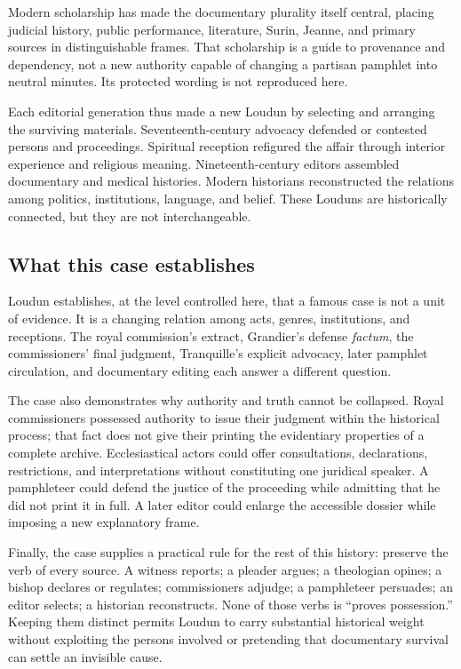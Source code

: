 Modern scholarship has made the documentary plurality itself central, placing
judicial history, public performance, literature, Surin, Jeanne, and primary
sources in distinguishable frames.  That scholarship is a guide to provenance
and dependency, not a new authority capable of changing a partisan pamphlet
into neutral minutes.  Its protected wording is not reproduced here.

Each editorial generation thus made a new Loudun by selecting and arranging
the surviving materials.  Seventeenth-century advocacy defended or contested
persons and proceedings.  Spiritual reception refigured the affair through
interior experience and religious meaning.  Nineteenth-century editors
assembled documentary and medical histories.  Modern historians reconstructed
the relations among politics, institutions, language, and belief.  These
Louduns are historically connected, but they are not interchangeable.

\subsection{What this case establishes}

Loudun establishes, at the level controlled here, that a famous case is not a
unit of evidence.  It is a changing relation among acts, genres, institutions,
and receptions.  The royal commission's extract, Grandier's defense
\emph{factum}, the commissioners' final judgment, Tranquille's explicit
advocacy, later pamphlet circulation, and documentary editing each answer a
different question.

The case also demonstrates why authority and truth cannot be collapsed.
Royal commissioners possessed authority to issue their judgment within the
historical process; that fact does not give their printing the evidentiary
properties of a complete archive.  Ecclesiastical actors could offer
consultations, declarations, restrictions, and interpretations without
constituting one juridical speaker.  A pamphleteer could defend the justice of
the proceeding while admitting that he did not print it in full.  A later
editor could enlarge the accessible dossier while imposing a new explanatory
frame.

Finally, the case supplies a practical rule for the rest of this history:
preserve the verb of every source.  A witness reports; a pleader argues; a
theologian opines; a bishop declares or regulates; commissioners adjudge; a
pamphleteer persuades; an editor selects; a historian reconstructs.  None of
those verbs is ``proves possession.''  Keeping them distinct permits Loudun to
carry substantial historical weight without exploiting the persons involved
or pretending that documentary survival can settle an invisible cause.

